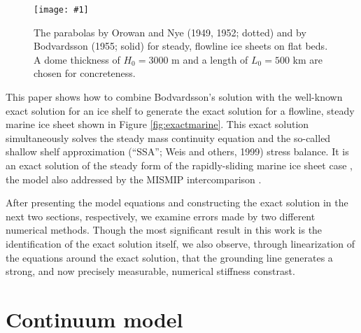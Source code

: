 \documentclass[review,letterpaper]{igs}
\newcommand{\onecol}[1]{\texttt{[image: \#1]}}
\begin{document}
\begin{figure}[ht]
\onecol{twoparabolas}
\caption{The parabolas by Orowan and Nye (1949, 1952; dotted) and by Bodvardsson (1955; solid) for steady, flowline ice sheets on flat beds.  A dome thickness of $H_0=3000$ m and a length of $L_0=500$ km are chosen for concreteness.} \label{fig:twoparabolas}
\end{figure}

This paper shows how to combine Bodvardsson's solution with the well-known exact solution for an ice shelf \citep{vanderVeen83,vanderVeen} to generate the exact solution for a flowline, steady marine ice sheet shown in Figure \ref{fig:exactmarine}.  This exact solution simultaneously solves the steady mass continuity equation and the so-called shallow shelf approximation (``SSA''; Weis and others, 1999)\nocite{WeisGreveHutter} stress balance.  It is an exact solution of the steady form of the rapidly-sliding marine ice sheet case \citep{SchoofMarine1}, the model also addressed by the MISMIP intercomparison \citep{MISMIP2012}.  

After presenting the model equations and constructing the exact solution in the next two sections, respectively, we examine errors made by two different numerical methods.  Though the most significant result in this work is the identification of the exact solution itself, we also observe, through linearization of the equations around the exact solution, that the grounding line generates a strong, and now precisely measurable, numerical stiffness constrast.


\section{Continuum model}
\end{document}
